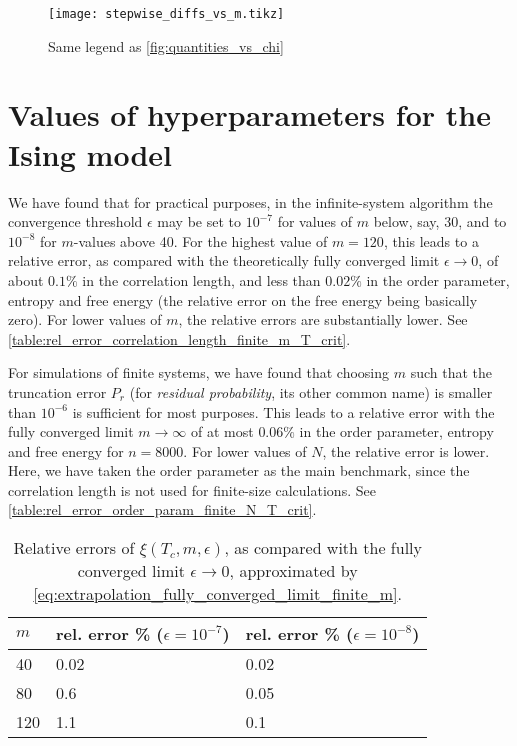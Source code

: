 \begin{figure}
  \texttt{[image: stepwise\_diffs\_vs\_m.tikz]}
  \caption{Same legend as \autoref{fig:quantities_vs_chi}}\label{fig:stepwise_diffs_vs_m}
\end{figure}


\section{Values of hyperparameters for the Ising model}
We have found that for practical purposes, in the infinite-system algorithm the convergence threshold $\epsilon$ may be
set to $10^{-7}$ for values of $m$ below, say, 30, and to $10^{-8}$ for $m$-values above 40.
For the highest value of $m = 120$, this leads to a relative error,
as compared with the theoretically fully converged limit $\epsilon \to 0$,
of about $0.1\%$ in the correlation length, and less than $0.02\%$ in the order parameter,
entropy and free energy (the relative error on the free energy being basically zero).
For lower values of $m$, the relative errors are substantially lower.
See \autoref{table:rel_error_correlation_length_finite_m_T_crit}.

For simulations of finite systems, we have found that choosing $m$ such that the truncation error $P_r$ (for
\emph{residual probability}, its other common name) is smaller than $10^{-6}$ is sufficient for most purposes.
This leads to a relative error with the fully converged limit $m \to \infty$ of at most $0.06\%$ in the order parameter,
entropy and free energy for $n = 8000$.
For lower values of $N$, the relative error is lower.
Here, we have taken the order parameter as the main benchmark, since the correlation length is not used for finite-size
calculations. See \autoref{table:rel_error_order_param_finite_N_T_crit}.

\begin{table}[]
\centering
\begin{tabular}{@{}lll@{}}
$m$ & rel. error \% ($\epsilon = 10^{-7}$) & rel. error \% ($\epsilon = 10^{-8}$) \\ \midrule
40  & 0.02                              & 0.02                              \\
80  & 0.6                               & 0.05                              \\
120 & 1.1                               & 0.1                               \\ \bottomrule
\end{tabular}
\caption{Relative errors of $\xi(T_c, m, \epsilon)$, as compared with the fully converged limit $\epsilon \to 0$,
approximated by
\autoref{eq:extrapolation_fully_converged_limit_finite_m}.}\label{table:rel_error_correlation_length_finite_m_T_crit}
\end{table}

